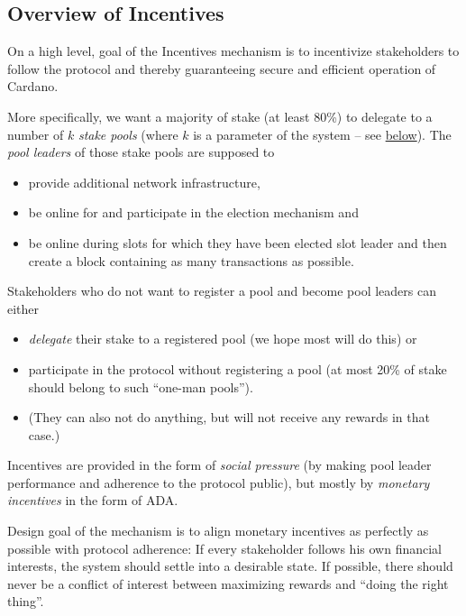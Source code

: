 \documentclass[11pt,a4paper]{article}
\begin{document}
\subsection{Overview of Incentives}
\label{overview-of-incentives}

On a high level, goal of the Incentives mechanism is to incentivize
stakeholders to follow the protocol and thereby guaranteeing secure and
efficient operation of Cardano.

More specifically, we want a majority of stake (at least 80\%) to
delegate to a number of \(k\) \emph{stake pools} (where \(k\) is a
parameter of the system -- see \hyperref[parameters]{below}). The
\emph{pool leaders} of those stake pools are supposed to

\begin{itemize}
\item
  provide additional network infrastructure,
\item
  be online for and participate in the election mechanism and
\item
  be online during slots for which they have been elected slot leader
  and then create a block containing as many transactions as possible.
\end{itemize}

Stakeholders who do not want to register a pool and become pool leaders
can either

\begin{itemize}
\item
  \emph{delegate} their stake to a registered pool (we hope most will do
  this) or
\item
  participate in the protocol without registering a pool (at most 20\%
  of stake should belong to such ``one-man pools'').
\item
  (They can also not do anything, but will not receive any rewards in
  that case.)
\end{itemize}

Incentives are provided in the form of \emph{social pressure} (by making
pool leader performance and adherence to the protocol public), but
mostly by \emph{monetary incentives} in the form of ADA.

Design goal of the mechanism is to align monetary incentives as
perfectly as possible with protocol adherence: If every stakeholder
follows his own financial interests, the system should settle into a
desirable state. If possible, there should never be a conflict of
interest between maximizing rewards and ``doing the right thing''.
\end{document}
